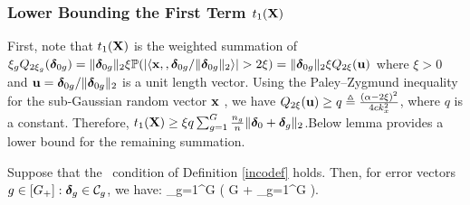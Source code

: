 \subsubsection{Lower Bounding the First Term $t_1(\mathbf{X})$}
First, note that $t_1(\mathbf{X})$ is the weighted summation of $\xi_g Q_{2\xi_g}(\boldsymbol{\delta}_{0g}) = \|\boldsymbol{\delta}_{0g}\|_{2}\xi \mathbb{P}(|\langle \mathbf{x}, , \boldsymbol{\delta}_{0g}/\|\boldsymbol{\delta}_{0g}\|_{2} \rangle| > 2\xi) = \|\boldsymbol{\delta}_{0g}\|_{2}\xi Q_{2\xi}(\mathbf{u})$ where $\xi > 0$ and $\mathbf{u} = \boldsymbol{\delta}_{0g}/\|\boldsymbol{\delta}_{0g}\|_{2}$ is a unit length vector. Using the Paley--Zygmund inequality for the sub-Gaussian random vector $\mathbf{x}$ \cite{trop15}, we have $Q_{2\xi}(\mathbf{u})  \geq q \triangleq \frac{(\alpha - 2\xi)^2}{4ck_x^2}$, where $q$ is a constant. Therefore, $t_1(\mathbf{X}) \geq \xi q \sum_{g=1}^G\frac{n_g}{n}\|\boldsymbol{\delta}_{0} +  \boldsymbol{\delta}_{g}\|_{2}$.Below lemma provides a lower bound for the remaining summation.
\begin{lemma} \label{incolem main} Suppose that the \ds\ condition of Definition \ref{incodef} holds. Then, for error vectors $g \in [G_+]: \ddelta_g \in \cC_g$, we have: 
	\be \nr 
	\sum_{g=1}^G  \geq{} \left( G + \sum_{g=1}^G   \right).
	\ee 
\end{lemma}	
